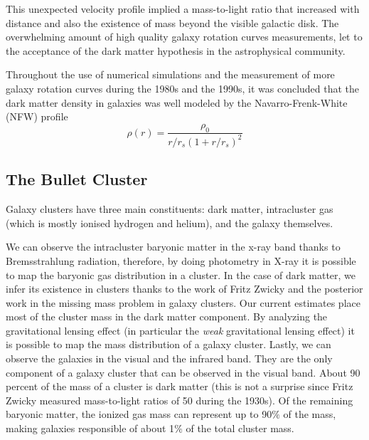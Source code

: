 This unexpected velocity profile implied a mass-to-light ratio that increased with distance and also the existence of mass beyond the visible galactic disk\cite{theIsMassOutside}.
The overwhelming amount of high quality galaxy rotation curves measurements, let to the acceptance of the dark matter hypothesis in the astrophysical community.

Throughout the use of numerical simulations and the measurement of more galaxy rotation curves during the 1980s and the 1990s, it was concluded that the dark matter density in galaxies was well modeled by the Navarro-Frenk-White (NFW) profile\cite{FWN}\cite{mariangela}
\begin{equation}
\rho(r) = \frac{\rho_0}{r/r_s(1+r/r_s)^2}
\end{equation}
\subsection{The Bullet Cluster}
\label{bulletExplain}
Galaxy clusters have three main constituents: dark matter, intracluster gas (which is mostly ionised hydrogen and helium), and the galaxy themselves.\cite{book:75345}

We can observe the intracluster baryonic matter in the x-ray band thanks to Bremsstrahlung radiation, therefore, by doing photometry in X-ray it is possible to map the baryonic gas distribution in a cluster.
In the case of dark matter, we infer its existence in clusters thanks to the work of Fritz Zwicky and the posterior work in the missing mass problem in galaxy clusters.
Our current estimates place most of the cluster mass in the dark matter component.
By analyzing the gravitational lensing effect (in particular the \emph{weak} gravitational lensing effect) it is possible to map the mass distribution of a galaxy cluster. 
Lastly, we can observe the galaxies in the visual and the infrared band.
They are the only component of a galaxy cluster that can be observed in the visual band.
About 90 percent of the mass of a cluster is dark matter (this is not a surprise since Fritz Zwicky measured mass-to-light ratios of 50 during the 1930s). Of the remaining baryonic matter, the ionized gas mass can represent up to 90$\%$ of the mass, making galaxies responsible of about 1$\%$ of the total cluster mass.

